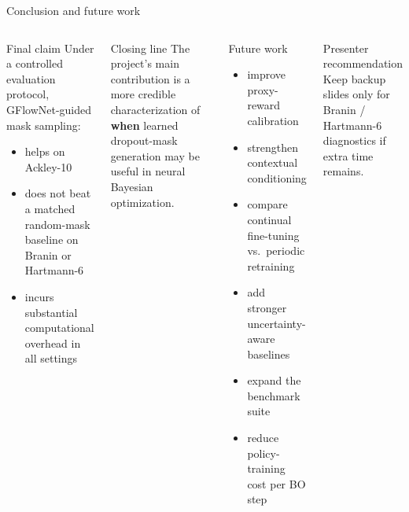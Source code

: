 \documentclass[aspectratio=169]{beamer}
\begin{document}
\begin{frame}{Conclusion and future work}
\vspace{-0.55em}
\begin{columns}[T,onlytextwidth]
\begin{minipage}[t][0.82\textheight]{\linewidth}\vspace{0pt}
  \begin{cardG}{Final claim}
  Under a controlled evaluation protocol, GFlowNet-guided mask sampling:
  \begin{itemize}
    \item helps on Ackley-10
    \item does not beat a matched random-mask baseline on Branin or Hartmann-6
    \item incurs substantial computational overhead in all settings
  \end{itemize}
  \end{cardG}

  \vfill

  \begin{cardA}{Closing line}
  The project's main contribution is a more credible characterization of \textbf{when} learned dropout-mask generation may be useful in neural Bayesian optimization.
  \end{cardA}
\end{minipage}

\begin{minipage}[t][0.82\textheight]{\linewidth}\vspace{0pt}
  \begin{card}{Future work}
  \begin{itemize}
    \item improve proxy-reward calibration
    \item strengthen contextual conditioning
    \item compare continual fine-tuning vs.\ periodic retraining
    \item add stronger uncertainty-aware baselines
    \item expand the benchmark suite
    \item reduce policy-training cost per BO step
  \end{itemize}
  \end{card}

  \vfill

  \begin{cardW}{Presenter recommendation}
  Keep backup slides only for Branin / Hartmann-6 diagnostics if extra time remains.
  \end{cardW}
\end{minipage}
\end{columns}
\end{frame}
\end{document}
